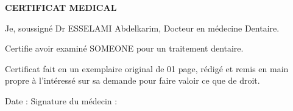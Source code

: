 
\begin{center}
{\Huge   \textbf{CERTIFICAT MEDICAL}} \\
\end{center}
\vspace{2cm}
\LARGE
\flushleft
Je, soussigné Dr ESSELAMI Abdelkarim, Docteur en médecine Dentaire. \par

Certifie avoir examiné SOMEONE pour un traitement dentaire.\par\bigskip
Certificat fait en un exemplaire original de 01 page, rédigé et remis en main propre à l'intéressé sur sa demande pour faire valoir ce que de droit.


\vspace*{4.5cm}
Date :	      \hspace*{4cm}Signature du médecin :  	


